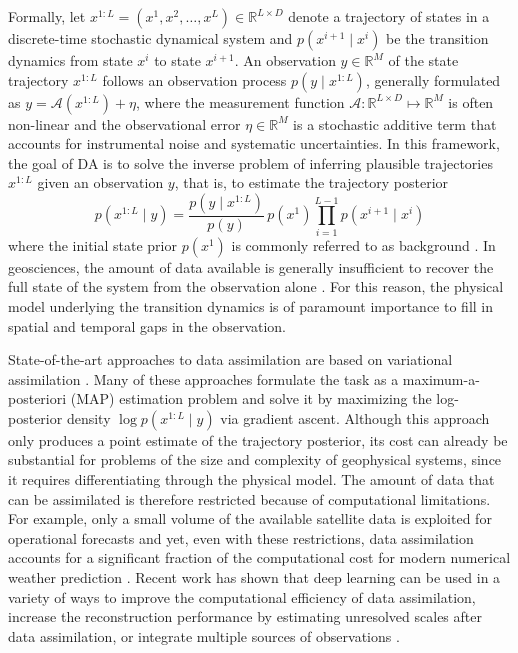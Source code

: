 Formally, let $x^{1:L} = (x^1, x^2, \dots, x^L) \in \mathbb{R}^{L \times D}$ denote a trajectory of states in a discrete-time stochastic dynamical system and $p(x^{i+1} \mid x^i)$ be the transition dynamics from state $x^i$ to state $x^{i+1}$. An observation $y \in \mathbb{R}^M$ of the state trajectory $x^{1:L}$ follows an observation process $p(y \mid x^{1:L})$, generally formulated as $y = \mathcal{A}(x^{1:L}) + \eta$, where the measurement function $\mathcal{A}: \mathbb{R}^{L \times D} \mapsto \mathbb{R}^M$ is often non-linear and the observational error $\eta \in \mathbb{R}^M$ is a stochastic additive term that accounts for instrumental noise and systematic uncertainties. In this framework, the goal of DA is to solve the inverse problem of inferring plausible trajectories $x^{1:L}$ given an observation $y$, that is, to estimate the trajectory posterior
\begin{equation}
    p(x^{1:L} \mid y) = \frac{p(y \mid x^{1:L})}{p(y)} \, p(x^1) \prod_{i=1}^{L-1} p(x^{i+1} \mid x^i)
\end{equation}
where the initial state prior $p(x^1)$ is commonly referred to as background \cite{tremolet2006accounting, tremolet2007modelerror, fisher2011weakconstraint, carrassi2018data, ecmwf2020ifs}. In geosciences, the amount of data available is generally insufficient to recover the full state of the system from the observation alone \cite{carrassi2018data}. For this reason, the physical model underlying the transition dynamics is of paramount importance to fill in spatial and temporal gaps in the observation.

State-of-the-art approaches to data assimilation are based on variational assimilation \cite{lorenc1986analysis, ledimet1986variational, tremolet2006accounting, tremolet2007modelerror, fisher2011weakconstraint}. Many of these approaches formulate the task as a maximum-a-posteriori (MAP) estimation problem and solve it by maximizing the log-posterior density $\log p(x^{1:L} \mid y)$ via gradient ascent. Although this approach only produces a point estimate of the trajectory posterior, its cost can already be substantial for problems of the size and complexity of geophysical systems, since it requires differentiating through the physical model. The amount of data that can be assimilated is therefore restricted because of computational limitations. For example, only a small volume of the available satellite data is exploited for operational forecasts and yet, even with these restrictions, data assimilation accounts for a significant fraction of the computational cost for modern numerical weather prediction \cite{bauer2015quiet, gustafsson2018survey}.
%
Recent work has shown that deep learning can be used in a variety of ways to improve the computational efficiency of data assimilation, increase the reconstruction performance by estimating unresolved scales after data assimilation, or integrate multiple sources of observations \cite{mack2020attentionbased, arcucci2021deep, frerix2021variational, fablet2021learning,yeung2022physicsinformed, brajard2020combining, brajard2021combining, zhang2022multisource}.

